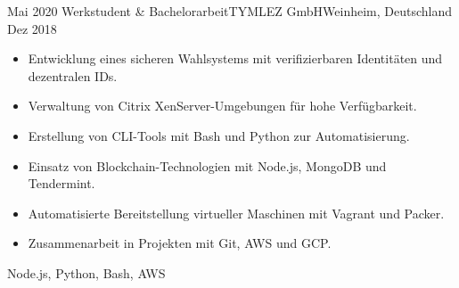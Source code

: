 \begin{experiences}
\emptySeparator
\experience
  {Mai 2020}
  {Werkstudent \& Bachelorarbeit}{TYMLEZ GmbH}{Weinheim, Deutschland}
  {Dez 2018}
  {
    \begin{itemize}
      \item Entwicklung eines sicheren Wahlsystems mit verifizierbaren Identit\"aten und dezentralen IDs.
      \item Verwaltung von Citrix XenServer-Umgebungen f\"ur hohe Verf\"ugbarkeit.
      \item Erstellung von CLI-Tools mit Bash und Python zur Automatisierung.
      \item Einsatz von Blockchain-Technologien mit Node.js, MongoDB und Tendermint.
      \item Automatisierte Bereitstellung virtueller Maschinen mit Vagrant und Packer.
      \item Zusammenarbeit in Projekten mit Git, AWS und GCP.
    \end{itemize}
  }
  {Node.js, Python, Bash, AWS}
\end{experiences}
